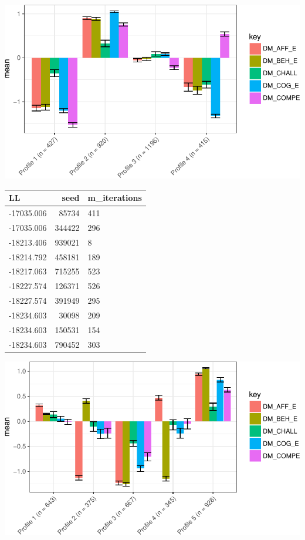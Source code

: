 \documentclass[]{msu-thesis}
\theoremstyle{definition}
\theoremstyle{definition}
\theoremstyle{definition}
\theoremstyle{remark}
\begin{document}
\begin{center}\includegraphics[width=0.8\linewidth]{rosenberg-dissertation_files/figure-latex/m1_4p-1} \end{center}

\begin{tabular}{l|r|l}
\hline
LL & seed & m\_iterations\\
\hline
-17035.006 & 85734 & 411\\
\hline
-17035.006 & 344422 & 296\\
\hline
-18213.406 & 939021 & 8\\
\hline
-18214.792 & 458181 & 189\\
\hline
-18217.063 & 715255 & 523\\
\hline
-18227.574 & 126371 & 526\\
\hline
-18227.574 & 391949 & 295\\
\hline
-18234.603 & 30098 & 209\\
\hline
-18234.603 & 150531 & 154\\
\hline
-18234.603 & 790452 & 303\\
\hline
\end{tabular}

\begin{center}\includegraphics[width=0.8\linewidth]{rosenberg-dissertation_files/figure-latex/m1_5p-1} \end{center}
\end{document}
